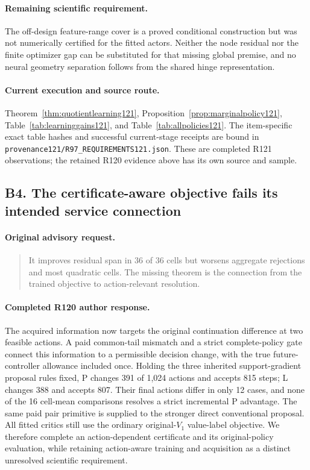 \paragraph{Remaining scientific requirement.}
The off-design feature-range cover is a proved conditional construction but was not numerically certified for the fitted actors. Neither the node residual nor the finite optimizer gap can be substituted for that missing global premise, and no neural geometry separation follows from the shared hinge representation.

\paragraph{Current execution and source route.}
Theorem~\ref{thm:quotientlearning121}, Proposition~\ref{prop:marginalpolicy121}, Table~\ref{tab:learninggains121}, and Table~\ref{tab:allpolicies121}.
The item-specific exact table hashes and successful current-stage receipts are bound in \nolinkurl{provenance121/R97_REQUIREMENTS121.json}. These are completed R121 observations; the retained R120 evidence above has its own source and sample.

\subsection{B4. The certificate-aware objective fails its intended service connection}
\label{response121:B4}

\paragraph{Original advisory request.}
\begin{quote}
It improves residual span in 36 of 36 cells but worsens aggregate rejections and most quadratic cells. The missing theorem is the connection from the trained objective to action-relevant resolution.
\end{quote}

\paragraph{Completed R120 author response.}
The acquired information now targets the original continuation difference at two feasible actions. A paid common-tail mismatch and a strict complete-policy gate connect this information to a permissible decision change, with the true future-controller allowance included once. Holding the three inherited support-gradient proposal rules fixed, P changes 391 of 1,024 actions and accepts 815 steps; L changes 388 and accepts 807. Their final actions differ in only 12 cases, and none of the 16 cell-mean comparisons resolves a strict incremental P advantage. The same paid pair primitive is supplied to the stronger direct conventional proposal. All fitted critics still use the ordinary original-$V_1$ value-label objective. We therefore complete an action-dependent certificate and its original-policy evaluation, while retaining action-aware training and acquisition as a distinct unresolved scientific requirement.

